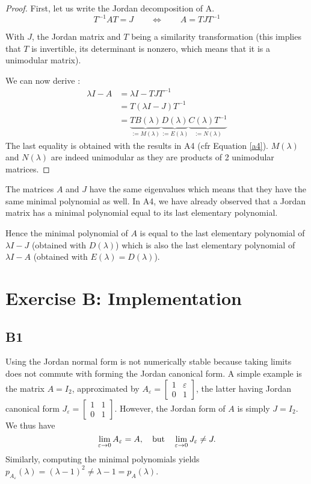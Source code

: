 \documentclass[11pt]{article}
\begin{document}
\begin{proof}
First, let us write the Jordan decomposition of A.
\[T^{-1} A T =J \qquad \Leftrightarrow \qquad A= T J T^{-1}
\]

With $J$, the Jordan matrix and $T$ being a similarity transformation (this implies that $T$ is invertible, its determinant is nonzero, which means that it is a unimodular matrix).

We can now derive :
\begin{align*}
\lambda I - A &= \lambda I - T J T^{-1}\\
&= T(\lambda I - J) T^{-1}\\
&= \underbrace{TB(\lambda)}_{:=M(\lambda)}\underbrace{D(\lambda)}_{:= E(\lambda)}\underbrace{C(\lambda)T^{-1}}_{:= N(\lambda)}
\end{align*}
The last equality is obtained with the results in A4 (cfr Equation \ref{a4}). 
$M(\lambda)$ and $N(\lambda)$ are indeed unimodular as they are products of 2 unimodular matrices.
\end{proof}

The matrices $A$ and $J$ have the same eigenvalues which means that they have the same minimal polynomial as well. In A4, we have already observed that a Jordan matrix has a minimal polynomial equal to its last elementary polynomial.

Hence the minimal polynomial of $A$ is equal to the last elementary polynomial of $\lambda I - J$ (obtained with $D(\lambda)$) which is also the last elementary polynomial of $\lambda I - A$ (obtained with $E(\lambda) = D(\lambda)$). 
\section*{Exercise B: Implementation}
\subsection*{B1}
Using the Jordan normal form is not numerically stable because taking limits does not commute with forming the Jordan canonical form.
A simple example is the matrix \(A = I_2\), approximated by \(A_\varepsilon = \left[\begin{smallmatrix} 1 & \varepsilon \\ 0 & 1\end{smallmatrix}\right]\), the latter having Jordan canonical form \(J_\varepsilon = \left[\begin{smallmatrix} 1 & 1 \\ 0 & 1\end{smallmatrix}\right]\).
However, the Jordan form of \(A\) is simply \(J = I_2\).
We thus have
\[
\lim_{\varepsilon \to 0} A_\varepsilon = A, \quad \textnormal{but} \quad \lim_{\varepsilon \to 0} J_\varepsilon \neq J.
\]
Similarly, computing the minimal polynomials yields \(p_{A_\varepsilon}(\lambda) = (\lambda - 1)^2 \ne \lambda - 1 = p_A(\lambda)\).
\end{document}
